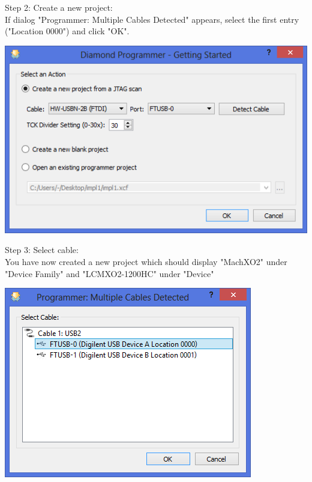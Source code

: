 \vspace{5mm}

\begin{minipage}{\linewidth}
Step 2: Create a new project: \\
If dialog "Programmer: Multiple Cables Detected" appears,
select the first entry ("Location 0000") and click "OK".
  \begin{center}
  \includegraphics[width=0.7\linewidth]{images/diamond02.png}
  \end{center}
\end{minipage}


\begin{minipage}{\linewidth}
Step 3: Select cable: \\
You have now created a new project which should display
"MachXO2" under "Device Family" and "LCMXO2-1200HC" under "Device"
  \begin{center}
  \includegraphics[width=0.6\linewidth]{images/diamond03.png}
  \end{center}
\end{minipage}

\vspace{5mm}

